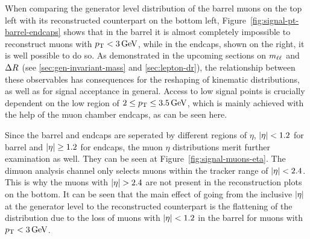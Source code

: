 When comparing the generator level distribution of the barrel muons on the top left with its reconstructed counterpart on the bottom left, Figure~\ref{fig:signal-pt-barrel-endcaps} shows that in the barrel it is almost completely impossible to reconstruct muons with $p_{\mathrm{T}} < 3\,\text{Ge\hspace{-.08em}V}$, while in the endcaps, shown on the right, it is well possible to do so. As demonstrated in the upcoming sections on $m_{\ell\ell}$ and $\Delta R$ (see \ref{sec:gen-invariant-mass} and \ref{sec:lepton-dr}), the relationship between these observables has consequences for the reshaping of kinematic distributions, as well as for signal acceptance in general. Access to low \dm signal points is crucially dependent on the low \pt region of $2 \leq p_{\mathrm{T}} \leq 3.5\,\text{Ge\hspace{-.08em}V}$, which is mainly achieved with the help of the muon chamber endcaps, as can be seen here.

Since the barrel and endcaps are seperated by different regions of $\eta$, $\abs{\eta} < 1.2$ for barrel and $\abs{\eta} \geq 1.2$ for endcaps, the muon $\eta$ distributions merit further examination as well. They can be seen at Figure~\ref{fig:signal-muons-eta}. The dimuon analysis channel only selects muons within the tracker range of $\abs{\eta}<2.4$. This is why the muons with $\abs{\eta}>2.4$ are not present in the reconstruction plots on the bottom. It can be seen that the main effect of going from the inclusive $\abs{\eta}$ at the generator level to the reconstructed counterpart is the flattening of the distribution due to the loss of muons with $\abs{\eta}<1.2$ in the barrel for muons with $p_{\mathrm{T}}<3\,\text{Ge\hspace{-.08em}V}$.

